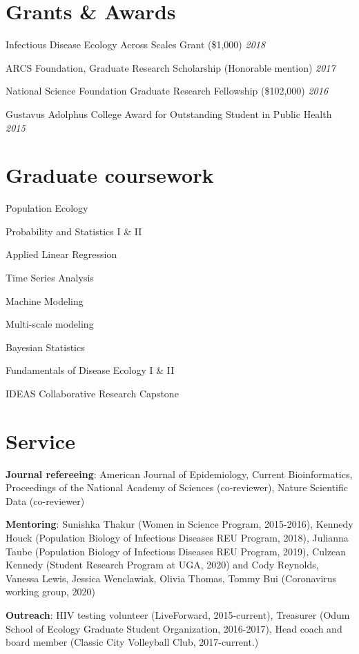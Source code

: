 \documentclass[letterpaper]{article}
\renewenvironment{itemize}{
  \begin{list}{}{
    \setlength{\leftmargin}{1.5em}
  }
}{
  \end{list}
}
\begin{document}
\section*{Grants \& Awards}
\begin{itemize}
\item Infectious Disease Ecology Across Scales Grant (\$1,000) \hfill \textit{2018} 
\item ARCS Foundation, Graduate Research Scholarship (Honorable mention) \hfill \textit{2017} 
\item National Science Foundation Graduate Research Fellowship (\$102,000) \hfill \textit{2016} 
\item Gustavus Adolphus College Award for Outstanding Student in Public Health \hfill \textit{2015} 
\end{itemize}

\section*{Graduate coursework}
\begin{multicols}{2}
\begin{itemize}
\item Population Ecology
\item Probability and Statistics I \& II
\item Applied Linear Regression
\item Time Series Analysis 
\item Machine Modeling
\item Multi-scale modeling
\item Bayesian Statistics
\item Fundamentals of Disease Ecology I \& II
\item IDEAS Collaborative Research Capstone 
\end{itemize}
\end{multicols}

\section*{Service}
\begin{itemize}
\item \textbf{Journal refereeing}: American Journal of Epidemiology, Current Bioinformatics, Proceedings of the National Academy of Sciences (co-reviewer), Nature Scientific Data (co-reviewer)
\item \textbf{Mentoring}: Sunishka Thakur (Women in Science Program, 2015-2016), Kennedy Houck (Population Biology of Infectious Diseases REU Program, 2018), Julianna Taube (Population Biology of Infectious Diseases REU Program, 2019), Culzean Kennedy (Student Research Program at UGA, 2020) and Cody Reynolds, Vanessa Lewis, Jessica Wenclawiak, Olivia Thomas, Tommy Bui (Coronavirus working group, 2020)
\item \textbf{Outreach}: HIV testing volunteer (LiveForward, 2015-current),  Treasurer (Odum School of Ecology Graduate Student Organization, 2016-2017), Head coach and board member (Classic City Volleyball Club, 2017-current.) 
\end{itemize}
\end{document}

